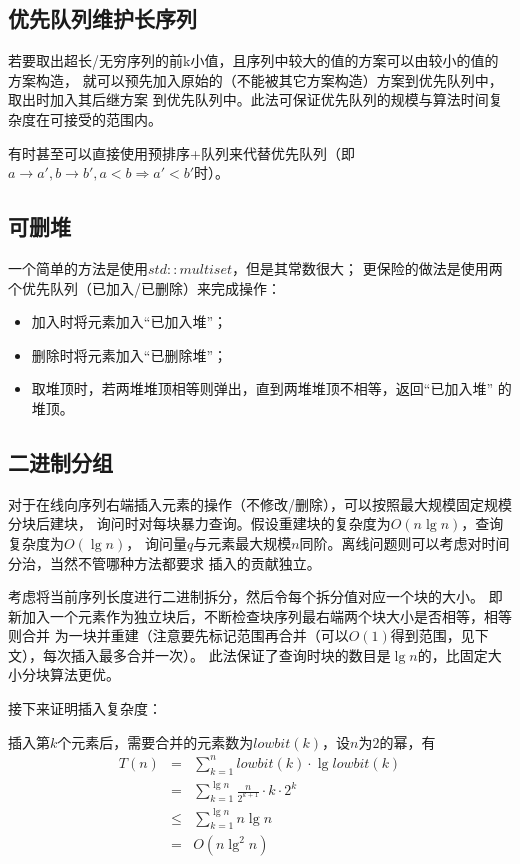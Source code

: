\subsection{优先队列维护长序列}\label{PQS}
若要取出超长/无穷序列的前k小值，且序列中较大的值的方案可以由较小的值的方案构造，
就可以预先加入原始的（不能被其它方案构造）方案到优先队列中，取出时加入其后继方案
到优先队列中。此法可保证优先队列的规模与算法时间复杂度在可接受的范围内。

有时甚至可以直接使用预排序+队列来代替优先队列（即$a\rightarrow a',b\rightarrow b',
a<b\Rightarrow a'<b'$时）。
\subsection{可删堆}\label{MultiSet}
一个简单的方法是使用$std::multiset$，但是其常数很大；
更保险的做法是使用两个优先队列（已加入/已删除）来完成操作：
\begin{itemize}
	\item 加入时将元素加入``已加入堆''；
	\item 删除时将元素加入``已删除堆''；
	\item 取堆顶时，若两堆堆顶相等则弹出，直到两堆堆顶不相等，返回``已加入堆''
	      的堆顶。
\end{itemize}
\subsection{二进制分组}
对于在线向序列右端插入元素的操作（不修改/删除），可以按照最大规模固定规模分块后建块，
询问时对每块暴力查询。假设重建块的复杂度为$O(n\lg n)$，查询复杂度为$O(\lg n)$，
询问量$q$与元素最大规模$n$同阶。离线问题则可以考虑对时间分治，当然不管哪种方法都要求
插入的贡献独立。

考虑将当前序列长度进行二进制拆分，然后令每个拆分值对应一个块的大小。
即新加入一个元素作为独立块后，不断检查块序列最右端两个块大小是否相等，相等则合并
为一块并重建（注意要先标记范围再合并（可以$O(1)$得到范围，见下文），每次插入最多合并一次）。
此法保证了查询时块的数目是$\lg n$的，比固定大小分块算法更优。

接下来证明插入复杂度：

插入第$k$个元素后，需要合并的元素数为$lowbit(k)$，设$n$为$2$的幂，有
\begin{eqnarray*}
    T(n)&=&\sum_{k=1}^n {lowbit(k)\cdot \lg lowbit(k)}\\
        &=&\sum_{k=1}^{\lg n} {\frac{n}{2^{k+1}}\cdot k\cdot 2^k}\\
        &\leq&\sum_{k=1}^{\lg n} {n \lg n}\\
        &=&O(n\lg^2 n)
\end{eqnarray*}
